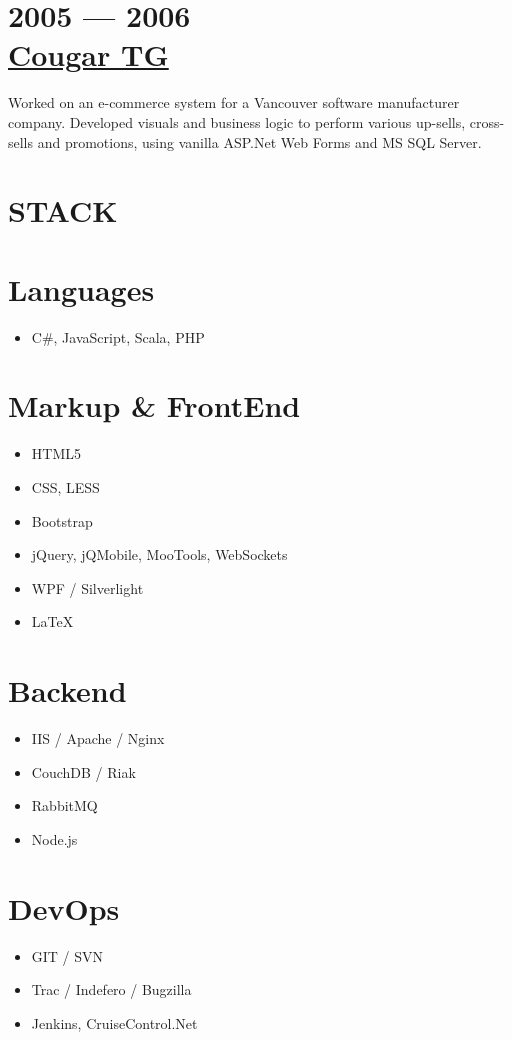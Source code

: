 \documentclass[margin]{res}
\begin{document}
\begin{resume}
	\section{2005 --- 2006\\\href{http://cougartg.com}{Cougar TG}}
	Worked on an e-commerce system for a Vancouver software manufacturer company. Developed visuals and business logic to perform various up-sells, cross-sells and promotions, using vanilla ASP.Net Web Forms and MS SQL Server.

\section{STACK} 
	\normalsize{\section{Languages}}
		\itemsep -2pt
 		\begin{itemize}
 			\item C\#, JavaScript, Scala, PHP
		\end{itemize}
	\normalsize{\section{Markup \& FrontEnd}}
		\itemsep -2pt
		\begin{itemize}
			\item HTML5
			\item CSS, LESS
			\item Bootstrap
			\item jQuery, jQMobile, MooTools, WebSockets
			\item WPF / Silverlight
			\item \LaTeX
		\end{itemize}
	\normalsize{\section{Backend}}
		\begin{itemize}
			\item IIS / Apache / Nginx
			\item CouchDB / Riak
			\item RabbitMQ
			\item Node.js
		\end{itemize}
	\normalsize{\section{DevOps}}
		\begin{itemize}
			\item GIT / SVN
			\item Trac / Indefero / Bugzilla
			\item Jenkins, CruiseControl.Net
		\end{itemize}
\newpage

\end{resume}
\end{document}
